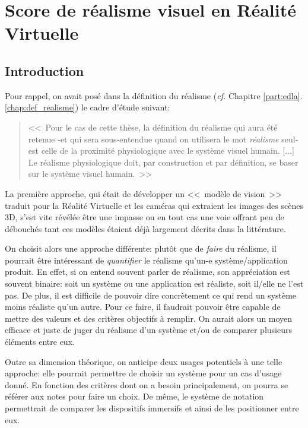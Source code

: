 \part{Score de réalisme visuel en Réalité Virtuelle}
	\chapter*{Introduction}
	\par Pour rappel, on avait posé dans la définition du réalisme (\textit{cf.} Chapitre \ref{part:edla}.\ref{chap:def_realisme}) le cadre d'étude suivant:
	\begin{quote}
		<<~Pour le cas de cette thèse, la définition du réalisme qui aura été retenue -et qui sera sous-entendue quand on utilisera le mot \textit{réalisme} seul- est celle de la proximité physiologique avec le système visuel humain. [...] Le réalisme physiologique doit, par construction et par définition, se baser sur le système visuel humain.~>>
	\end{quote}
	La première approche, qui était de développer un <<~modèle de vision~>> traduit pour la Réalité Virtuelle et les caméras qui extraient les images des scènes 3D, s'est vite révélée être une impasse ou en tout cas une voie offrant peu de débouchés tant ces modèles étaient déjà largement décrits dans la littérature.
	
	\par On choisit alors une approche différente: plutôt que de \textit{faire} du réalisme, il pourrait être intéressant de \textit{quantifier} le réalisme qu'un-e système/application produit. En effet, si on entend souvent parler de réalisme, son appréciation est souvent binaire: soit un système ou une application est réaliste, soit il/elle ne l'est pas. De plus, il est difficile de pouvoir dire concrètement ce qui rend un système moins réaliste qu'un autre. Pour ce faire, il faudrait pouvoir être capable de mettre des valeurs et des critères objectifs à remplir. On aurait alors un moyen efficace et juste de juger du réalisme d'un système et/ou de comparer plusieurs éléments entre eux.
	
	\par Outre sa dimension théorique, on anticipe deux usages potentiels à une telle approche: elle pourrait permettre de choisir un système pour un cas d'usage donné. En fonction des critères dont on a besoin principalement, on pourra se référer aux notes pour faire un choix. De même, le système de notation permettrait de comparer les dispositifs immersifs et ainsi de les positionner entre eux.